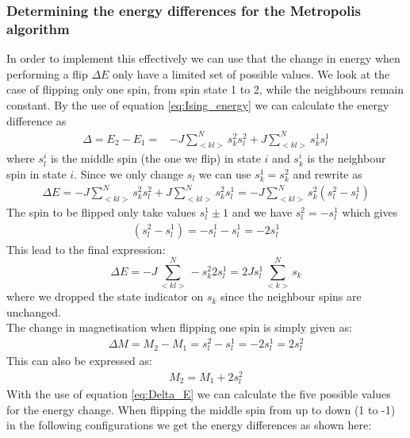 \documentclass[%
 reprint,
nofootinbib,
aps,
]{revtex4-1}
\begin{document}
\subsubsection{Determining the energy differences for the Metropolis algorithm}\label{sec:energy_change}
In order to implement this effectively we can use that the change in energy when performing a flip $\Delta E$ only have a limited set of possible values. We look at the case of flipping only one spin, from spin state 1 to 2, while the neighbours remain constant. By the use of equation \ref{eq:Ising_energy} we can calculate the energy difference as
\begin{align*}
    \Delta  = E_2 - E_1 =& -J \sum_{<kl>}^N s_k^2s_l^2 + J \sum_{<kl>}^N s_k^1s_l^1
\end{align*}
where $s_l^i$ is the middle spin (the one we flip) in state $i$ and $s_k^i$ is the neighbour spin in state $i$. Since we only change $s_l$ we can use $s_k^1 = s_k^2$ and rewrite as
\begin{align*}
    \Delta E = -J \sum_{<kl>}^N s_k^2s_l^2 + J \sum_{<kl>}^N s_k^2s_l^1 = -J\sum_{<kl>}^N s_k^2(s_l^2 - s_l^1)
\end{align*}
The spin to be flipped only take values $s_l^1 \pm 1$ and we have $s_l^2 = - s_l^1$ which gives
\begin{align*}
    (s_l^2 - s_l^1) = - s_l^1 - s_l^1 = -2s_l^1
\end{align*}
This lead to the final expression:
\begin{equation}
     \Delta E  = -J\sum_{<kl>}^N -s_k^2 2s_l^1 = 2Js_l^1\sum_{<k>}^N s_k
     \label{eq:Delta_E}
\end{equation}
where we dropped the state indicator on $s_k$ since the neighbour spins are unchanged. \\
The change in magnetisation when flipping one spin is simply given as:
\begin{align*}
    \Delta M = M_2 - M_1 = s_l^2 - s_l^1 = -2s_l^1 = 2s_l^2
\end{align*}
This can also be expressed as:
\begin{align*}
    M_2 = M_1 + 2s_l^2
\end{align*}
With the use of equation \ref{eq:Delta_E} we can calculate the five possible values for the energy change. When flipping the middle spin from up to down (1 to -1) in the following configurations we get the energy differences as shown here:
\end{document}

